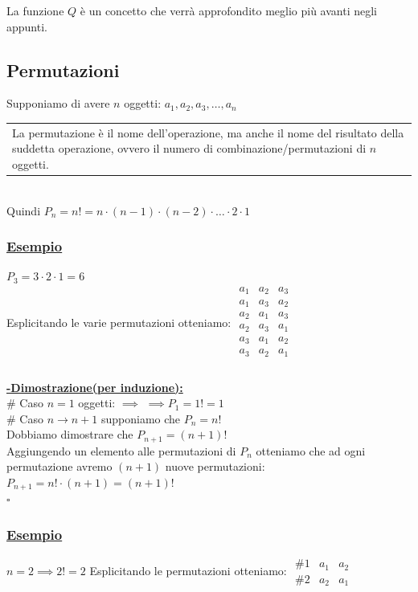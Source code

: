 \documentclass{article}
\begin{document}
La funzione \(Q\) è un concetto che verrà approfondito meglio più avanti negli appunti.

\subsection{Permutazioni}
Supponiamo di avere \(n\) oggetti: \(a_1,a_2,a_3, \dots, a_n\)
\\
\begin{tabular}{|p{13cm}}
La permutazione è il nome dell’operazione, ma anche il nome del risultato della suddetta operazione, ovvero il numero di combinazione/permutazioni di $n$ oggetti. 
\end{tabular}
\\
Quindi $P_n = n! = n \cdot (n-1) \cdot (n-2) \cdot \dots \cdot 2 \cdot 1$
\subsubsection{\underline{Esempio}}
$P_3 = 3 \cdot 2 \cdot 1 = 6$ \\
Esplicitando le varie permutazioni otteniamo: $\begin{matrix}

a_1 & a_2 & a_3 \\
a_1 & a_3 & a_2 \\
a_2 & a_1 & a_3 \\
a_2 & a_3 & a_1 \\
a_3 & a_1 & a_2 \\
a_3 & a_2 & a_1 \\

\end{matrix}$ \\ \\
\underline{\textsf{\textbf{-Dimostrazione(per induzione):}}} \\
\# Caso $n=1$ oggetti: $\implies$ $\implies P_1 = 1! = 1$ \\
\# Caso $n \rightarrow n+1$ supponiamo che $P_n = n!$ \\
Dobbiamo dimostrare che $P_{n+1} = (n+1)!$ \\
Aggiungendo un elemento alle permutazioni di $P_n$ otteniamo che ad ogni permutazione avremo $(n+1)$ nuove permutazioni: \\
$P_{n+1} = n! \cdot (n+1) = (n+1)!$ \\
\hspace*{0pt}\hfill $\square$
\subsubsection{\underline{Esempio}}
$n = 2 \implies 2! = 2$ 
Esplicitando le permutazioni otteniamo: $\begin{matrix}
\#1 & a_1 & a_2 \\
\#2 & a_2 & a_1
\end{matrix}$ 
\\
\end{document}
